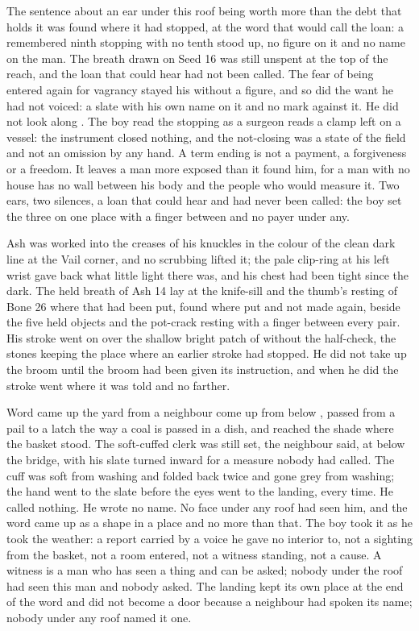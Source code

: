 The sentence about an ear under this roof being worth more than the debt that holds it was found where it had stopped, at the word that would call the loan: a remembered ninth stopping with no tenth stood up, no figure on it and no name on the man. The breath drawn on Seed 16 was still unspent at the top of the reach, and the loan that could hear had not been called. The fear of being entered again for vagrancy stayed his without a figure, and so did the want he had not voiced: a slate with his own name on it and no mark against it. He did not look along . The boy read the stopping as a surgeon reads a clamp left on a vessel: the instrument closed nothing, and the not-closing was a state of the field and not an omission by any hand. A term ending is not a payment, a forgiveness or a freedom. It leaves a man more exposed than it found him, for a man with no house has no wall between his body and the people who would measure it. Two ears, two silences, a loan that could hear and had never been called: the boy set the three on one place with a finger between and no payer under any.

Ash was worked into the creases of his knuckles in the colour of the clean dark line at the Vail corner, and no scrubbing lifted it; the pale clip-ring at his left wrist gave back what little light there was, and his chest had been tight since the dark. The held breath of Ash 14 lay at the knife-sill and the thumb's resting of Bone 26 where that had been put, found where put and not made again, beside the five held objects and the pot-crack resting with a finger between every pair. His stroke went on over the shallow bright patch of  without the half-check, the stones keeping the place where an earlier stroke had stopped. He did not take up the broom until the broom had been given its instruction, and when he did the stroke went where it was told and no farther.

\scenebreak

Word came up the yard from a neighbour come up from below , passed from a pail to a latch the way a coal is passed in a dish, and reached the shade where the basket stood. The soft-cuffed clerk was still set, the neighbour said, at  below the bridge, with his slate turned inward for a measure nobody had called. The cuff was soft from washing and folded back twice and gone grey from washing; the hand went to the slate before the eyes went to the landing, every time. He called nothing. He wrote no name. No face under any roof had seen him, and the word came up as a shape in a place and no more than that. The boy took it as he took the weather: a report carried by a voice he gave no interior to, not a sighting from the basket, not a room entered, not a witness standing, not a cause. A witness is a man who has seen a thing and can be asked; nobody under the roof had seen this man and nobody asked. The landing kept its own place at the end of the word and did not become a door because a neighbour had spoken its name; nobody under any roof named it one.

